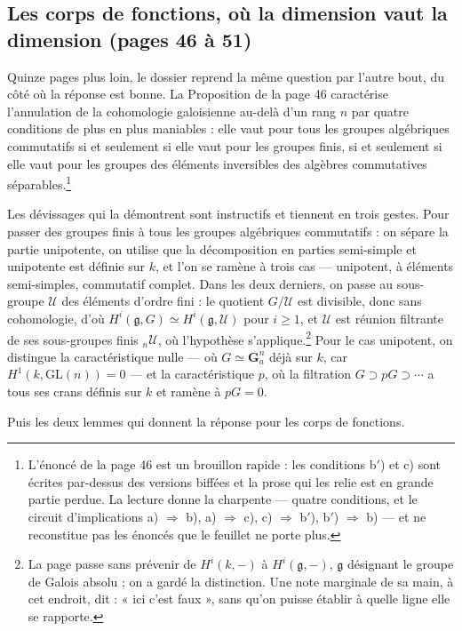 \documentclass[11pt,a4paper]{article}
\begin{document}
\subsection*{Les corps de fonctions, où la dimension vaut la dimension (pages 46 à 51)}

Quinze pages plus loin, le dossier reprend la même question par l'autre bout, du
côté où la réponse est bonne. La Proposition de la page 46 caractérise
l'annulation de la cohomologie galoisienne au-delà d'un rang $n$ par quatre
conditions de plus en plus maniables : elle vaut pour tous les groupes
algébriques commutatifs si et seulement si elle vaut pour les groupes finis, si
et seulement si elle vaut pour les groupes des éléments inversibles des
algèbres commutatives séparables.\footnote{L'énoncé de la page 46 est un
brouillon rapide : les conditions b$'$) et c) sont écrites par-dessus des
versions biffées et la prose qui les relie est en grande partie perdue. La
lecture donne la charpente — quatre conditions, et le circuit d'implications
a) $\Rightarrow$ b), a) $\Rightarrow$ c), c) $\Rightarrow$ b$'$),
b$'$) $\Rightarrow$ b) — et ne reconstitue pas les énoncés que le feuillet ne
porte plus.}

Les dévissages qui la démontrent sont instructifs et tiennent en trois gestes.
Pour passer des groupes finis à tous les groupes algébriques commutatifs : on
sépare la partie unipotente, on utilise que la décomposition en parties
semi-simple et unipotente est définie sur $k$, et l'on se ramène à trois cas —
unipotent, à éléments semi-simples, commutatif complet. Dans les deux derniers,
on passe au sous-groupe $\mathcal{U}$ des éléments d'ordre fini : le quotient
$G/\mathcal{U}$ est divisible, donc sans cohomologie, d'où
$H^i(\mathfrak{g}, G) \simeq H^i(\mathfrak{g}, \mathcal{U})$ pour $i \geqslant
1$, et $\mathcal{U}$ est réunion filtrante de ses sous-groupes finis
${}_n\mathcal{U}$, où l'hypothèse s'applique.\footnote{La page passe sans
prévenir de $H^i(k,-)$ à $H^i(\mathfrak{g},-)$, $\mathfrak{g}$ désignant le
groupe de Galois absolu ; on a gardé la distinction. Une note marginale de sa
main, à cet endroit, dit : « ici c'est faux », sans qu'on puisse établir à
quelle ligne elle se rapporte.} Pour le cas unipotent, on distingue la
caractéristique nulle — où $G \simeq \mathbf{G}_a^n$ déjà sur $k$, car
$H^1(k, \mathrm{GL}(n)) = 0$ — et la caractéristique $p$, où la filtration
$G \supset pG \supset \cdots$ a tous ses crans définis sur $k$ et ramène à
$pG = 0$.

Puis les deux lemmes qui donnent la réponse pour les corps de fonctions.
\end{document}
